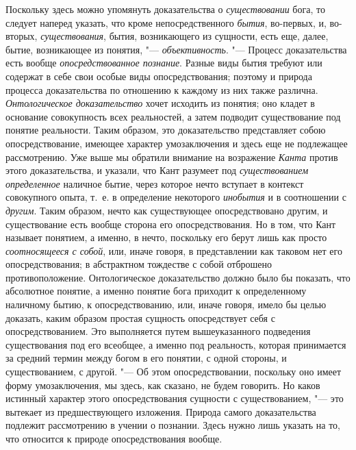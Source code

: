 Поскольку здесь можно упомянуть доказательства о
{\em существовании} бога, то следует наперед указать,
что кроме непосредственного {\em бытия}, во-первых, и,
во-вторых, {\em существования}, бытия, возникающего из
сущности, есть еще, далее, бытие, возникающее из понятия, "---
{\em объективность}. "--- Процесс доказательства есть
вообще {\em опосредствованное познание}. Разные виды
бытия требуют или содержат в себе свои особые виды опосредствования;
поэтому и природа процесса доказательства по отношению к каждому из них
также различна. {\em Онтологическое доказательство}
хочет исходить из понятия; оно кладет в основание совокупность всех
реальностей, а затем подводит существование под понятие реальности. Таким
образом, это доказательство представляет собою опосредствование, имеющее
характер умозаключения и здесь еще не подлежащее рассмотрению. Уже
выше
мы обратили внимание на возражение {\em Канта} против
этого доказательства, и указали, что Кант разумеет под
{\em существованием определенное} наличное бытие, через
которое нечто вступает в контекст совокупного опыта, т.~е. в определение
некоторого {\em инобытия} и в соотношении с
{\em другим}. Таким образом, нечто как существующее
опосредствовано другим, и существование есть вообще сторона его
опосредствования. Но в том, что Кант называет понятием, а именно, в нечто,
поскольку его берут лишь как просто {\em соотносящееся
с собой}, или, иначе говоря, в представлении как таковом нет его
опосредствования; в абстрактном тождестве с собой отброшено
противоположение. Онтологическое доказательство должно было бы показать,
что абсолютное понятие, а именно понятие бога приходит к определенному
наличному бытию, к опосредствованию, или, иначе говоря, имело бы целью
доказать, каким образом простая сущность опосредствует себя с
опосредствованием. Это выполняется путем вышеуказанного подведения
существования под его всеобщее, а именно под реальность, которая
принимается за средний термин между богом в его понятии, с одной стороны, и
существованием, с другой. "--- Об этом опосредствовании, поскольку оно имеет
форму умозаключения, мы здесь, как сказано, не будем говорить. Но каков
истинный характер этого опосредствования сущности с существованием, "--- это
вытекает из предшествующего изложения. Природа самого доказательства
подлежит рассмотрению в учении о познании. Здесь нужно лишь указать на то,
что относится к природе опосредствования вообще.

